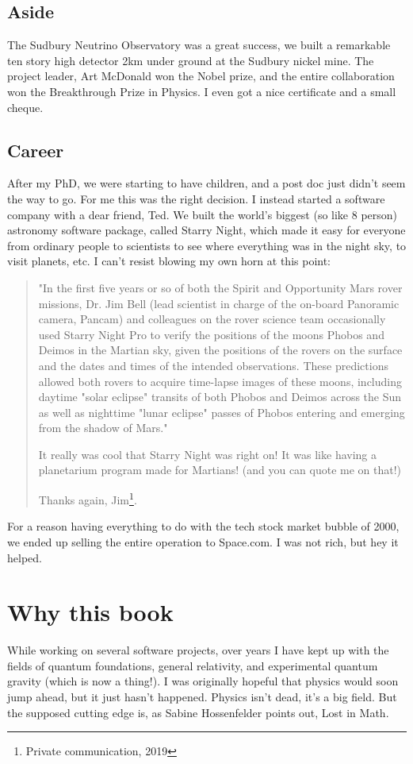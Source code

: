 \documentclass[../rzero]{subfiles}
\begin{document}
\subsection*{Aside}
The Sudbury Neutrino Observatory was a great success, we built a remarkable ten story high detector 2km under ground at the Sudbury nickel mine. The project leader, Art McDonald won the Nobel prize, and the entire collaboration won the Breakthrough Prize in Physics. I even got a nice certificate and a small cheque.

\subsection*{Career}
After my PhD, we were starting to have children, and a post doc just didn't seem the way to go. For me this was the right decision. I instead started a software company with a dear friend, Ted. We built the world's biggest (so like 8 person) astronomy software package, called Starry Night, which made it easy for everyone from ordinary people to scientists to see where everything was in the night sky, to visit planets, etc. I can't resist blowing my own horn at this point:
\begin{quotation}
	"In the first five years or so of both the Spirit and Opportunity Mars rover missions, Dr. Jim Bell (lead scientist in charge of the on-board Panoramic camera, Pancam) and colleagues on the rover science team occasionally used Starry Night Pro to verify the positions of the moons Phobos and Deimos in the Martian sky, given the positions of the rovers on the surface and the dates and times of the intended observations. These predictions allowed both rovers to acquire time-lapse images of these moons, including daytime "solar eclipse" transits of both Phobos and Deimos across the Sun as well as nighttime "lunar eclipse" passes of Phobos entering and emerging from the shadow of Mars."
 
It really was cool that Starry Night was right on!  It was like having a planetarium program made for Martians!   (and you can quote me on that!)
 
Thanks again,
Jim\footnote{Private communication, 2019}.
\end{quotation} 

For a reason having everything to do with the tech stock market bubble of 2000, we ended up selling the entire operation to Space.com. I was not rich, but hey it helped. 


\section*{Why this book}
While working on several software projects, over years I have kept up with the fields of quantum foundations, general relativity, and experimental quantum gravity (which is now a thing!)\cite{Marletto2017}. I was originally hopeful that physics would soon jump ahead, but it just hasn't happened. Physics isn't dead, it's a big field. But the supposed cutting edge is, as Sabine Hossenfelder points out, Lost in Math\cite{hossenfelder2018lost}.
\end{document}
